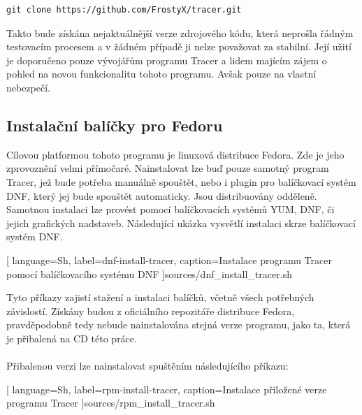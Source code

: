 \documentclass[
  field=inf,
  biblatex,
  glossaries,
  index
]{kidiplom}
\begin{document}
	\begin{lstlisting}[gobble=12]
		git clone https://github.com/FrostyX/tracer.git
	\end{lstlisting}

	Takto bude získána nejaktuálnější verze zdrojového kódu, která neprošla řádným testovacím procesem a v žádném případě ji nelze považovat za stabilní. Její užití je doporučeno pouze vývojářům programu Tracer a lidem majícím zájem o pohled na novou funkcionalitu tohoto programu. Avšak pouze na vlastní nebezpečí.

	\subsection{Instalační balíčky pro Fedoru}
	Cílovou platformou tohoto programu je linuxová distribuce Fedora. Zde je jeho zprovoznění velmi přímočaré. Nainstalovat lze buď pouze samotný program Tracer, jež bude potřeba manuálně spouštět, nebo i plugin pro balíčkovací systém DNF\@, který jej bude spouštět automaticky. Jsou distribuovány odděleně. Samotnou instalaci lze provést pomocí balíčkovacích systémů YUM, DNF, či jejich grafických nadstaveb. Následující ukázka vysvětlí instalaci skrze balíčkovací systém DNF.

	
	[
		language=Sh,
		label=dnf-install-tracer,
		caption={Instalace programu Tracer pomocí balíčkovacího systému DNF}
	]{sources/dnf_install_tracer.sh}

	Tyto příkazy zajistí stažení a instalaci balíčků, včetně všech potřebných závislostí. Získány budou z oficiálního repozitáře distribuce Fedora, pravděpodobně tedy nebude nainstalována stejná verze programu, jako ta, která je přibalená na CD této práce.
	\\
	\\
	Přibalenou verzi lze nainstalovat spuštěním následujícího příkazu:

	
	[
		language=Sh,
		label=rpm-install-tracer,
		caption={Instalace přiložené verze programu Tracer}
	]{sources/rpm_install_tracer.sh}
\end{document}

